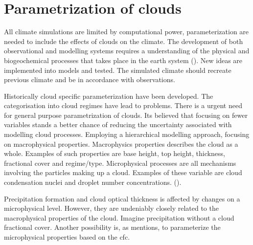 \section{Parametrization of clouds} \label{sec:param_clouds}

All climate simulations are limited by computational power, parameterization are needed to include the effects of clouds on the climate. The development of both observational and modelling systems requires a understanding of the physical and biogeochemical processes that takes place in the earth system (\cite{Simmons2016Observation2016-2025}). New ideas are implemented into models and tested. The simulated climate should recreate previous climate and be in accordance with observations. 

Historically cloud specific parameterization have been developed. The categorisation into cloud regimes have lead to problems. There is a urgent need for general purpose parametrization of clouds. Its believed that focusing on fewer variables stands a better chance of reducing the uncertainty associated with modelling cloud processes. Employing a hierarchical modelling approach, focusing on macrophysical properties. Macrophysics properties describes the cloud as a whole. Examples of such properties are base height, top height, thickness, fractional cover and regime/type. Microphysical processes are all mechanisms involving the particles making up a cloud. Examples of these variable are cloud condensation nuclei and droplet number concentrations. (\cite{Grabowski2019ModelingBetter}).

Precipitation formation and cloud optical thickness is affected by changes on a microphysical level. However, they are undeniably closely related to the macrophysical properties of the cloud. Imagine precipitation without a cloud fractional cover. Another possibility is, as \cite{Fowler1996LiquidAssumptions} mentions, to parameterize the microphysical properties based on the \acrshort{cfc}.


